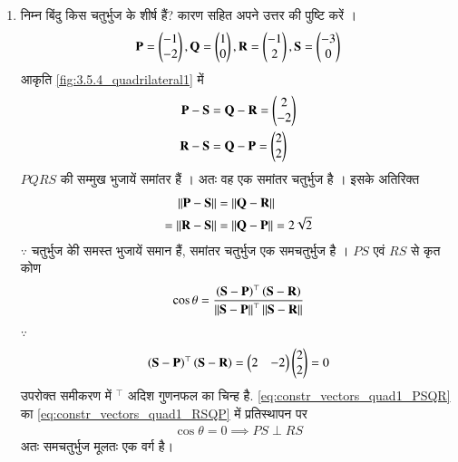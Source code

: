 %
\renewcommand{\theequation}{\theenumi}
\begin{enumerate}[label=\thesection.\arabic*.,ref=\thesection.\theenumi]


\item निम्न बिंदु किस चतुर्भुज के शीर्ष हैं? कारण सहित अपने उत्तर की पुष्टि करें ।
\begin{align}
\mathbf{P} = \begin{pmatrix}-1\\-2\end{pmatrix}, \mathbf{Q} =\begin{pmatrix}1\\0\end{pmatrix},
\mathbf{R} =\begin{pmatrix}-1\\2\end{pmatrix}, \mathbf{S} =\begin{pmatrix}-3\\0\end{pmatrix}
\end{align}
\solution
आकृति 	\ref{fig:3.5.4_quadrilateral1} में
\begin{align}
\label{eq:constr_vectors_quad1_PSQR}
 \mathbf{P} - \mathbf{S} &= 
 \mathbf{Q} - \mathbf{R} = \begin{pmatrix}2\\-2\end{pmatrix}
\\
\mathbf {R} - \mathbf {S} &=
 \mathbf {Q} - \mathbf {P} = \begin{pmatrix}2\\2\end{pmatrix}
\label{eq:constr_vectors_quad1_RSQP}
\end{align}
%
$PQRS$ की सम्मुख भुजायें  समांतर हैं । अतः वह एक समांतर चतुर्भुज है । इसके अतिरिक्त
\begin{align}
\left\lVert \mathbf{P} - \mathbf{S}\right\rVert &= 
\left\lVert \mathbf{Q} - \mathbf{R}\right\rVert 
\\
=\left\lVert\mathbf {R} - \mathbf {S}\right\rVert &=
\left\lVert \mathbf {Q} - \mathbf {P}\right\rVert = 2\sqrt{2}
\end{align}
%
$\because$ चतुर्भुज कीे समस्त भुजायें समान हैं, समांतर चतुर्भुज एक समचतुर्भुज है ।   $PS$ एवं
$RS$ से कृत कोण
\begin{align}
\cos \theta = \frac{\left(\mathbf{S}-\mathbf{P}\right)^{\top}\left(\mathbf{S}-\mathbf{R}\right)}{\left\lVert\mathbf{S}-\mathbf{P}\right\rVert^{\top}\left\lVert\mathbf{S}-\mathbf{R}\right\rVert}
\end{align}
%
$\because $
\begin{align}
\left(\mathbf{S}-\mathbf{P}\right)^{\top}\left(\mathbf{S}-\mathbf{R}\right) = \begin{pmatrix}2 & -2\end{pmatrix}\begin{pmatrix}2\\2\end{pmatrix} = 0
\end{align}
उपरोक्त समीकरण में $^{\top}$ अदिश गुणनफल का चिन्ह है.
\eqref{eq:constr_vectors_quad1_PSQR} का  \eqref{eq:constr_vectors_quad1_RSQP} में प्रतिस्थापन पर
\begin{align}
\cos \theta = 0 \implies PS \perp RS
\end{align}
%
अतः समचतुर्भुज मूलतः एक वर्ग है। 
\begin{figure}[!ht]
	\centering

\end{figure}
\end{enumerate}
